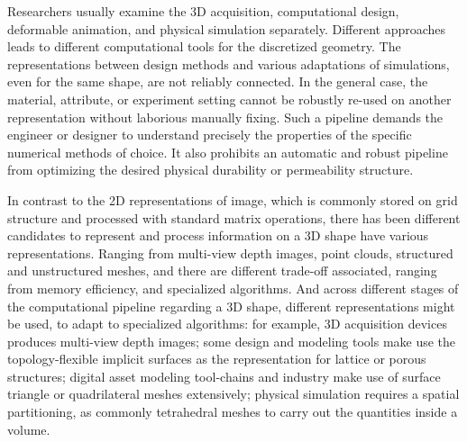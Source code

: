 Researchers usually examine the 3D acquisition, computational design, deformable animation, and physical simulation separately. Different approaches leads to different computational tools for the discretized geometry.
The representations between design methods and various adaptations of simulations, even for the same shape, are not reliably connected.
In the general case, the material, attribute, or experiment setting cannot be robustly re-used on another representation without laborious manually fixing. Such a pipeline demands the engineer or designer to understand precisely the properties of the specific numerical methods of choice. It also prohibits an automatic and robust pipeline from optimizing the desired physical durability or permeability structure.

In contrast to the 2D representations of image, which is commonly stored on grid structure and processed with standard matrix operations, there has been different candidates to represent and process information on a 3D shape have various representations. 
Ranging from multi-view depth images, point clouds, structured and unstructured meshes, and there are different trade-off associated, ranging from memory efficiency, and specialized algorithms. And across different stages of the computational pipeline regarding a 3D shape, different representations might be used, to adapt to specialized algorithms: for example, 3D acquisition devices produces multi-view depth images; some design and modeling tools make use the topology-flexible implicit surfaces as the representation for lattice or porous structures; digital asset modeling tool-chains and industry make use of surface triangle or quadrilateral meshes extensively; physical simulation requires a spatial partitioning, as commonly tetrahedral meshes to carry out the quantities inside a volume. 

